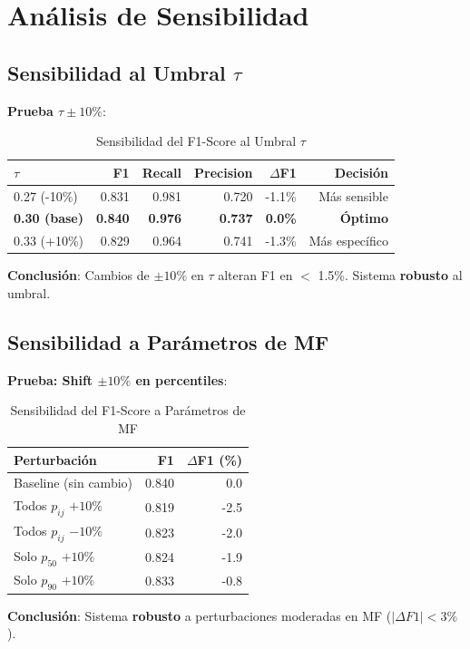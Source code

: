 \documentclass[12pt,letterpaper,twoside]{report}
\begin{document}
\section{Análisis de Sensibilidad}

\subsection{Sensibilidad al Umbral $\tau$}

\begin{calculobox}
\textbf{Prueba $\tau \pm 10\%$}:

\begin{table}[H]
\centering
\caption{Sensibilidad del F1-Score al Umbral $\tau$}
\label{tab:tau_sensitivity}
\begin{tabular}{@{}lrrrrr@{}}
\toprule
\textbf{$\tau$} & \textbf{F1} & \textbf{Recall} & \textbf{Precision} & \textbf{$\Delta$F1} & \textbf{Decisión} \\
\midrule
0.27 (-10\%) & 0.831 & 0.981 & 0.720 & -1.1\% & Más sensible \\
\textbf{0.30 (base)} & \textbf{0.840} & \textbf{0.976} & \textbf{0.737} & \textbf{0.0\%} & \textbf{Óptimo} \\
0.33 (+10\%) & 0.829 & 0.964 & 0.741 & -1.3\% & Más específico \\
\bottomrule
\end{tabular}
\end{table}

\textbf{Conclusión}: Cambios de $\pm 10\%$ en $\tau$ alteran F1 en $<$ 1.5\%. Sistema \textbf{robusto} al umbral.
\end{calculobox}

\subsection{Sensibilidad a Parámetros de MF}

\begin{calculobox}
\textbf{Prueba: Shift $\pm 10\%$ en percentiles}:

\begin{table}[H]
\centering
\caption{Sensibilidad del F1-Score a Parámetros de MF}
\label{tab:mf_sensitivity}
\begin{tabular}{@{}lrr@{}}
\toprule
\textbf{Perturbación} & \textbf{F1} & \textbf{$\Delta$F1 (\%)} \\
\midrule
Baseline (sin cambio)   & 0.840 & 0.0 \\
Todos $p_{ij}$ $+10\%$  & 0.819 & -2.5 \\
Todos $p_{ij}$ $-10\%$  & 0.823 & -2.0 \\
Solo $p_{50}$ $+10\%$   & 0.824 & -1.9 \\
Solo $p_{90}$ $+10\%$   & 0.833 & -0.8 \\
\bottomrule
\end{tabular}
\end{table}

\textbf{Conclusión}: Sistema \textbf{robusto} a perturbaciones moderadas en MF ($|\Delta F1| < 3\%$).
\end{calculobox}
\end{document}
